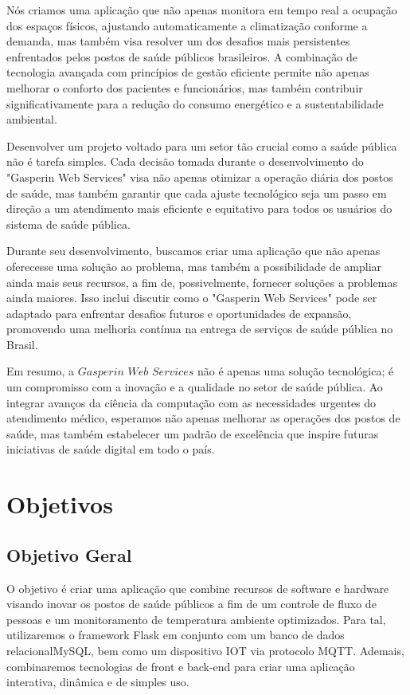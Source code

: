 \documentclass[conference, a4paper, 12pt]{IEEEtran}
\begin{document}
  Nós criamos uma aplicação que não apenas monitora em tempo real a ocupação dos espaços físicos, ajustando automaticamente a climatização conforme a demanda, mas também visa resolver um dos desafios mais persistentes enfrentados pelos postos de saúde públicos brasileiros. A combinação de tecnologia avançada com princípios de gestão eficiente permite não apenas melhorar o conforto dos pacientes e funcionários, mas também contribuir significativamente para a redução do consumo energético e a sustentabilidade ambiental.

  Desenvolver um projeto voltado para um setor tão crucial como a saúde pública não é tarefa simples. Cada decisão tomada durante o desenvolvimento do "Gasperin Web Services" visa não apenas otimizar a operação diária dos postos de saúde, mas também garantir que cada ajuste tecnológico seja um passo em direção a um atendimento mais eficiente e equitativo para todos os usuários do sistema de saúde pública.

  Durante seu desenvolvimento, buscamos criar uma aplicação que não apenas oferecesse uma solução ao problema, mas também a possibilidade de ampliar ainda mais seus recursos, a fim de, possivelmente, fornecer soluções a problemas ainda maiores. Isso inclui discutir como o "Gasperin Web Services" pode ser adaptado para enfrentar desafios futuros e oportunidades de expansão, promovendo uma melhoria contínua na entrega de serviços de saúde pública no Brasil.

  Em resumo, a $Gasperin$ $Web$ $Services$ não é apenas uma solução tecnológica; é um compromisso com a inovação e a qualidade no setor de saúde pública. Ao integrar avanços da ciência da computação com as necessidades urgentes do atendimento médico, esperamos não apenas melhorar as operações dos postos de saúde, mas também estabelecer um padrão de excelência que inspire futuras iniciativas de saúde digital em todo o país.

  \section{Objetivos}
  \subsection{Objetivo Geral}
  O objetivo é criar uma aplicação que combine recursos de software e hardware visando inovar os postos de saúde públicos a fim de um controle de fluxo de pessoas e um monitoramento de temperatura ambiente optimizados. Para tal, utilizaremos o framework Flask em conjunto com um banco de dados relacionalMySQL, bem como um dispositivo IOT via protocolo MQTT. Ademais, combinaremos tecnologias de front e back-end para criar uma aplicação interativa, dinâmica e de simples uso. 
\end{document}
